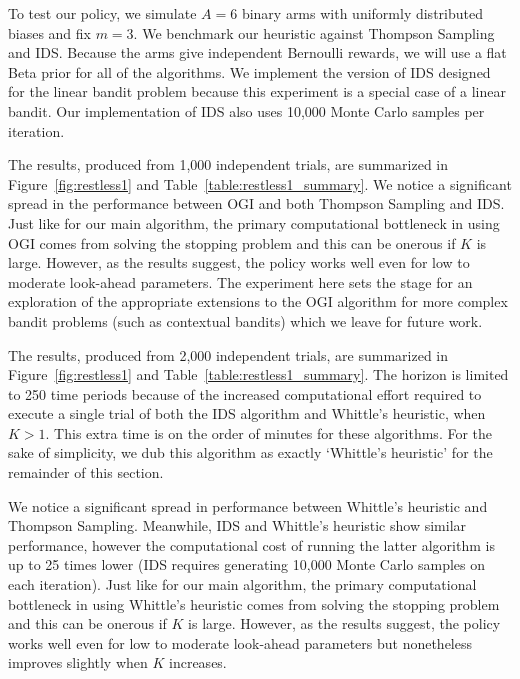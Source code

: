 To test our policy, we simulate $A = 6$ binary arms with uniformly distributed biases and fix $m=3$. 
We benchmark our heuristic against Thompson Sampling and IDS. Because the arms give independent Bernoulli rewards, we will use a flat Beta prior for all of the algorithms. We implement the version of IDS designed for the linear bandit problem because this experiment is a special case of a linear bandit. Our implementation of IDS also uses {10,000 Monte Carlo} samples per iteration.

The results, produced from 1,000 independent trials, are summarized in Figure~\ref{fig:restless1} and Table~\ref{table:restless1_summary}. We notice a significant spread in the performance between OGI and both Thompson Sampling and IDS. Just like for our main algorithm, the primary computational bottleneck in using OGI comes from solving the stopping problem and this can be onerous if $K$ is large. However, as the results suggest, the policy works well even for low to moderate look-ahead parameters. The experiment here sets the stage for an exploration of the appropriate extensions to the OGI algorithm for more complex bandit problems (such as contextual bandits) which we leave for future work. 

The results, produced from 2,000 independent trials, are summarized in Figure~\ref{fig:restless1} and Table~\ref{table:restless1_summary}. The horizon is limited to 250 time periods because of the increased computational effort required to execute a single trial of both the IDS algorithm and Whittle's heuristic, when $K > 1$. This extra time is on the order of minutes for these algorithms.
For the sake of simplicity, we dub this algorithm as exactly `Whittle's heuristic' for the remainder of this section.

{We notice a significant spread in performance between Whittle's heuristic and Thompson Sampling. Meanwhile, IDS and Whittle's heuristic show similar performance, however the computational cost of running the latter algorithm is up to 25 times lower (IDS requires generating 10,000 Monte Carlo samples on each iteration). Just like for our main algorithm, the primary computational bottleneck in using Whittle's heuristic comes from solving the stopping problem and this can be onerous if $K$ is large. However, as the results suggest, the policy works well even for low to moderate look-ahead parameters but nonetheless improves slightly when $K$ increases.%
}

